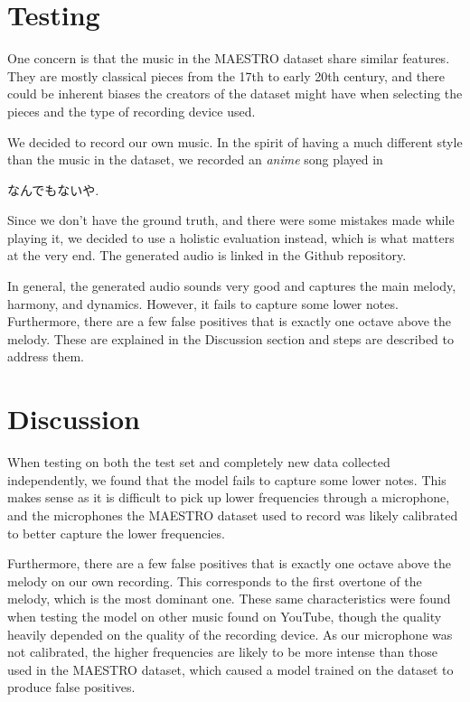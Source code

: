 \documentclass[a4paper,twocolumn,10pt]{article}
\begin{document}
\section{Testing}
One concern is that the music in the MAESTRO dataset share similar features. They are mostly classical pieces from the 17th to early 20th century\cite{maestro}, and there could be inherent biases the creators of the dataset might have when selecting the pieces and the type of recording device used.

We decided to record our own music. In the spirit of having a much different style than the music in the dataset, we recorded an \textit{anime} song played in \begin{CJK}{UTF8}{min}なんでもないや.\end{CJK}

Since we don't have the ground truth, and there were some mistakes made while playing it, we decided to use a holistic evaluation instead, which is what matters at the very end. The generated audio is linked in the Github repository.

In general, the generated audio sounds very good and captures the main melody, harmony, and dynamics. However, it fails to capture some lower notes. Furthermore, there are a few false positives that is exactly one octave above the melody. These are explained in the Discussion section and steps are described to address them.

\section{Discussion}
When testing on both the test set and completely new data collected independently, we found that the model fails to capture some lower notes. This makes sense as it is difficult to pick up lower frequencies through a microphone, and the microphones the MAESTRO dataset used to record was likely calibrated to better capture the lower frequencies.

Furthermore, there are a few false positives that is exactly one octave above the melody on our own recording. This corresponds to the first overtone of the melody, which is the most dominant one. These same characteristics were found when testing the model on other music found on YouTube, though the quality heavily depended on the quality of the recording device. As our microphone was not calibrated, the higher frequencies are likely to be more intense than those used in the MAESTRO dataset, which caused a model trained on the dataset to produce false positives.
\end{document}
